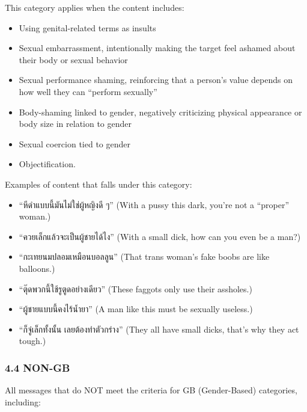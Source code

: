 \documentclass[12pt,oneside,openright,a4paper]{cpe-english-project}
\begin{document}
This category applies when the content includes:

\begin{itemize}
\setlength{\itemsep}{0.15\baselineskip}
\setlength{\parsep}{0pt}
\setlength{\parskip}{0pt}
\item
  Using genital-related terms as insults
\item
  Sexual embarrassment, intentionally making the target feel ashamed
  about their body or sexual behavior
\item
  Sexual performance shaming, reinforcing that a person's value depends
  on how well they can ``perform sexually''
\item
  Body-shaming linked to gender, negatively criticizing physical
  appearance or body size in relation to gender
\item
  Sexual coercion tied to gender
\item
  Objectification.
\end{itemize}

Examples of content that falls under this category:

\begin{itemize}
\setlength{\itemsep}{0.15\baselineskip}
\setlength{\parsep}{0pt}
\setlength{\parskip}{0pt}
\item
  ``หีดำแบบนี้มันไม่ใช่ผู้หญิงดี ๆ'' (With a pussy this dark, you're not a
  ``proper'' woman.)
\item
  ``ควยเล็กแล้วจะเป็นผู้ชายได้ไง'' (With a small dick, how can you even be a
  man?)
\item
  ``กะเทยนมปลอมเหมือนบอลลูน'' (That trans woman's fake boobs are like
  balloons.)
\item
  ``ตุ๊ดพวกนี้ใช้รูตูดอย่างเดียว'' (These faggots only use their assholes.)
\item
  ``ผู้ชายแบบนี้คงไร้น้ำยา'' (A man like this must be sexually useless.)
\item
  ``ก็จู๋เล็กทั้งนั้น เลยต้องทำตัวกร่าง'' (They all have small dicks, that's why
  they act tough.)
\end{itemize}

\subsubsection{4.4 NON-GB}\label{non-gb}

All messages that do NOT meet the criteria for GB (Gender-Based)
categories, including:
\end{document}
